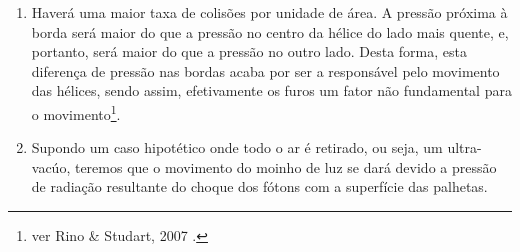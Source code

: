 \documentclass[12pt,a4paper]{article}
\begin{document}
\begin{enumerate}
    \item Haverá uma maior taxa de colisões por unidade de área. A pressão próxima à borda será maior do que a pressão no centro da hélice do lado mais quente, e, portanto, será maior do que a pressão no outro lado. Desta forma, esta diferença de pressão nas bordas acaba por ser a responsável pelo movimento das hélices, sendo assim, efetivamente os furos um fator não fundamental para o movimento\footnote{ver Rino \& Studart, 2007 \cite{Rino_Studart_2007}.}.



    \item Supondo um caso hipotético onde todo o ar é retirado, ou seja, um ultra-vacúo, teremos que o movimento do moinho de luz se dará devido a pressão de radiação resultante do choque dos fótons com a superfície das palhetas.
    
\end{enumerate}

\noindent\makebox[\linewidth]{\rule{\paperwidth}{0.4pt}}
\newpage

\end{document}
